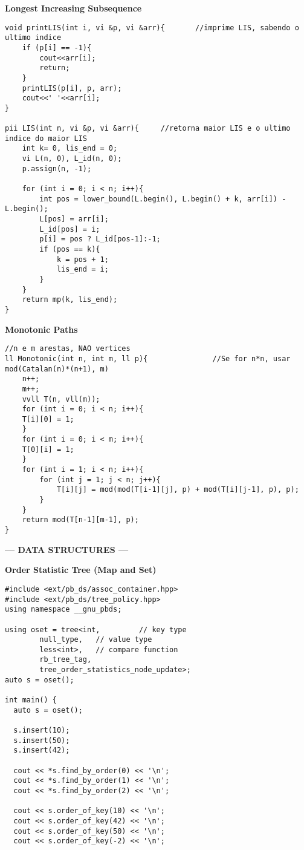 \documentclass{article}
\begin{document}
\begin{multicols}{2}
\large
\huge\textbf{Longest Increasing Subsequence}
\large
\begin{lstlisting}
void printLIS(int i, vi &p, vi &arr){       //imprime LIS, sabendo o ultimo indice
	if (p[i] == -1){
		cout<<arr[i];
		return;
	}
	printLIS(p[i], p, arr);
	cout<<' '<<arr[i];
}

pii LIS(int n, vi &p, vi &arr){     //retorna maior LIS e o ultimo indice do maior LIS
	int k= 0, lis_end = 0;
	vi L(n, 0), L_id(n, 0);
	p.assign(n, -1);

	for (int i = 0; i < n; i++){
		int pos = lower_bound(L.begin(), L.begin() + k, arr[i]) - L.begin();
		L[pos] = arr[i];
		L_id[pos] = i;
		p[i] = pos ? L_id[pos-1]:-1;
		if (pos == k){
			k = pos + 1;
			lis_end = i;
		}
	}
	return mp(k, lis_end);
}
\end{lstlisting}


\large
\huge\textbf{Monotonic Paths}
\large
\begin{lstlisting}
//n e m arestas, NAO vertices
ll Monotonic(int n, int m, ll p){				//Se for n*n, usar mod(Catalan(n)*(n+1), m)
	n++;
	m++;
	vvll T(n, vll(m));
	for (int i = 0; i < n; i++){
	T[i][0] = 1;
	}
	for (int i = 0; i < m; i++){
	T[0][i] = 1;
	}
	for (int i = 1; i < n; i++){
		for (int j = 1; j < n; j++){
			T[i][j] = mod(mod(T[i-1][j], p) + mod(T[i][j-1], p), p);
		}
	}
	return mod(T[n-1][m-1], p);
}
\end{lstlisting}


\large
\begin{center}
\huge\textbf{--- DATA STRUCTURES ---}
\end{center}
\large

\huge\textbf{Order Statistic Tree (Map and Set)}
\begin{lstlisting}
#include <ext/pb_ds/assoc_container.hpp>
#include <ext/pb_ds/tree_policy.hpp>
using namespace __gnu_pbds;

using oset = tree<int,         // key type
		null_type,   // value type
		less<int>,   // compare function
		rb_tree_tag,
		tree_order_statistics_node_update>;
auto s = oset();

int main() {
  auto s = oset();

  s.insert(10);
  s.insert(50);
  s.insert(42);

  cout << *s.find_by_order(0) << '\n';
  cout << *s.find_by_order(1) << '\n';
  cout << *s.find_by_order(2) << '\n';

  cout << s.order_of_key(10) << '\n';
  cout << s.order_of_key(42) << '\n';
  cout << s.order_of_key(50) << '\n';
  cout << s.order_of_key(-2) << '\n';


\end{lstlisting}
\end{multicols}
\end{document}
